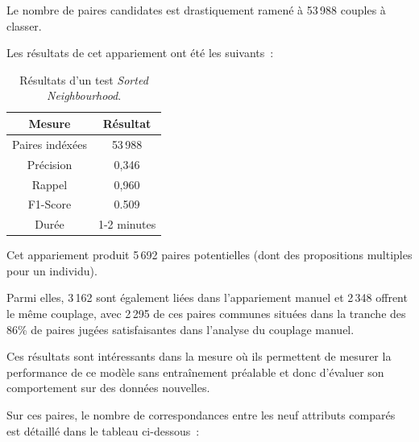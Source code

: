 \documentclass[a4paper,12pt,twoside]{book}
\begin{document}
	            Le nombre de paires candidates est drastiquement ramené à 53\,988 couples à classer.
	            \pagebreak
	            
	            Les résultats de cet appariement ont été les suivants~:
	            
	            \begin{table}[htbp]
    	            \centering
                    \renewcommand\cellalign{cl}
    			        \begin{tabular}{|c|c|}
    			        \hline
			            Mesure & Résultat\\\hline
			            Paires indéxées & 53\,988\\\hline
			            Précision & 0,346\\\hline
			            Rappel & 0,960\\\hline
			            F1-Score & 0.509\\\hline
			            Durée & 1-2 minutes\\\hline
                    \end{tabular}
                \caption{Résultats d'un test \textit{Sorted Neighbourhood}.}\label{tab14}
			    \end{table}   
                \vspace{-0.8em}
	            
                Cet appariement produit 5\,692 paires potentielles (dont des propositions multiples pour un individu).
                
                Parmi elles, 3\,162 sont également liées dans l'appariement manuel et 2\,348 offrent le même couplage, avec 2\,295 de ces paires communes situées dans la tranche des 86\% de paires jugées satisfaisantes dans l'analyse du couplage manuel.
                
                Ces résultats sont intéressants dans la mesure où ils permettent de mesurer la performance de ce modèle sans entraînement préalable et donc d'évaluer son comportement sur des données nouvelles.
                \bigskip
                
                Sur ces paires, le nombre de correspondances entre les neuf attributs comparés est détaillé dans le tableau ci-dessous~:
                
\end{document}
